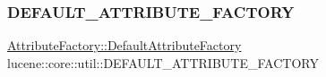 \subsubsection{\texorpdfstring{D\+E\+F\+A\+U\+L\+T\+\_\+\+A\+T\+T\+R\+I\+B\+U\+T\+E\+\_\+\+F\+A\+C\+T\+O\+RY}{DEFAULT\_ATTRIBUTE\_FACTORY}}
{\footnotesize\ttfamily \mbox{\hyperlink{classlucene_1_1core_1_1util_1_1AttributeFactory_1_1DefaultAttributeFactory}{Attribute\+Factory\+::\+Default\+Attribute\+Factory}} lucene\+::core\+::util\+::\+D\+E\+F\+A\+U\+L\+T\+\_\+\+A\+T\+T\+R\+I\+B\+U\+T\+E\+\_\+\+F\+A\+C\+T\+O\+RY\hspace{0.3cm}{\ttfamily [static]}}

